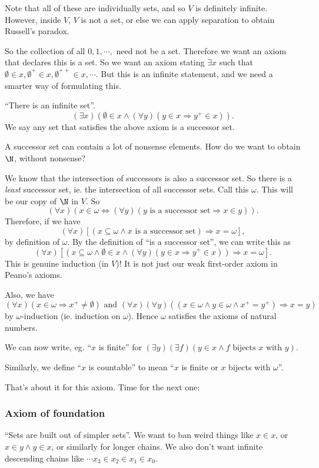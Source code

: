 \documentclass[a4paper]{article}
\begin{document}
Note that all of these are individually sets, and so $V$ is definitely infinite. However, inside $V$, $V$ is not a set, or else we can apply separation to obtain Russell's paradox.

So the collection of all $0, 1, \cdots, $ need not be a set. Therefore we want an axiom that declares this is a set. So we want an axiom stating $\exists x$ such that $\emptyset\in x, \emptyset^+\in x, \emptyset^{++}\in x, \cdots$. But this is an infinite statement, and we need a smarter way of formulating this.

\begin{axiom}
  ``There is an infinite set''.
  \[
    (\exists x)(\emptyset\in x \wedge (\forall y)(y\in x \Rightarrow y^+ \in x)).
  \]
  We say any set that satisfies the above axiom is a successor set.
\end{axiom}
A successor set can contain a lot of nonsense elements. How do we want to obtain $\N$, without nonsense?

We know that the intersection of successors is also a successor set. So there is a \emph{least} successor set, ie. the intersection of all successor sets. Call this $\omega$. This will be our copy of $\N$ in $V$. So
\[
  (\forall x)(x\in \omega \Leftrightarrow (\forall y)(y\text{ is a successor set} \Rightarrow  x \in y)).
\]
Therefore, if we have
\[
  (\forall x)[(x \subseteq \omega\wedge x\text{ is a successor set}) \Rightarrow  x = \omega],
\]
by definition of $\omega$. By the definition of ``is a successor set'', we can write this as
\[
  (\forall x)[(x\subseteq \omega \wedge \emptyset\in x \wedge (\forall y)(y\in x \Rightarrow  y^+ \in x))\Rightarrow  x = \omega].
\]
This is genuine induction (in $V$)! It is not just our weak first-order axiom in Peano's axioms.

Also, we have
\[
  (\forall x)(x\in \omega \Rightarrow  x^+ \not = \emptyset)\text{ and }(\forall x)(\forall y)((x\in \omega \wedge y\in \omega \wedge x^+ = y^+) \Rightarrow  x = y)
\]
by $\omega$-induction (ie. induction on $\omega$). Hence $\omega$ satisfies the axioms of natural numbers.

We can now write, eg. ``$x$ is finite'' for $(\exists y)(\exists f)(y\in x \wedge f\text{ bijects }x\text{ with }y)$.

Similarly, we define ``$x$ is countable'' to mean ``$x$ is finite or $x$ bijects with $\omega$''.

That's about it for this axiom. Time for the next one:
\subsubsection*{Axiom of foundation}
``Sets are built out of simpler sets''. We want to ban weird things like $x\in x$, or $x\in y\wedge y\in x$, or similarly for longer chains. We also don't want infinite descending chains like $\cdots x_3 \in x_2 \in x_1 \in x_0$.
\end{document}
